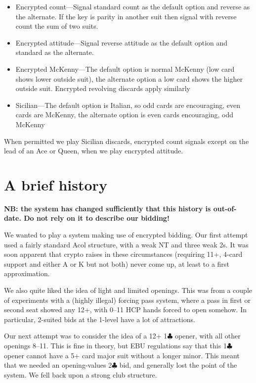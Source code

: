 \documentclass[a4paper,14pt]{extarticle}
\begin{document}
\begin{itemize}

\item Encrypted count---Signal standard count as the default option and reverse as the
alternate. If the key is parity in another suit then signal with reverse count
the sum of two suits.

\item Encrypted attitude---Signal reverse attitude as the default option and standard as
the alternate.

\item Encrypted McKenny---The default option is normal McKenny (low card shows lower
outside suit), the alternate option a low card shows the higher outside suit. Encrypted
revolving discards apply similarly

\item Sicilian---The default option is Italian, so odd cards are encouraging,
even cards are McKenny, the alternate option is even cards encouraging, odd
McKenny 

\end{itemize}

When permitted we play Sicilian discards, encrypted count signals except on the
lead of an Ace or Queen, when we play encrypted attitude.

\newpage

\section{A brief history}
\label{sec:history}

{\bf NB: the system has changed sufficiently that this history is out-of-date.  Do
not rely on it to describe our bidding! }

We wanted to play a system making use of encrypted bidding.  Our first attempt
used a fairly standard Acol structure, with a weak NT and three weak 2s.  It
was soon apparent that crypto raises in these circumstances (requiring 11+,
4-card support and either A or K but not both) never come up, at least to a
first approximation.

We also quite liked the idea of light and limited openings.  This was from a
couple of experiments with a (highly illegal) forcing pass system, where a pass
in first or second seat showed any 12+, with 0--11 HCP hands forced to open
somehow.  In particular, 2-suited bids at the 1-level have a lot of
attractions.

Our next attempt was to consider the idea of a 12+ 1$\clubsuit$ opener, with all other
openings 8--11.  This is fine in theory, but EBU regulations say that this 1$\clubsuit$
opener cannot have a 5+ card major suit without a longer minor.  This meant
that we needed an opening-values 2$\clubsuit$ bid, and generally lost the point of the
system.  We fell back upon a strong club structure.
\end{document}
